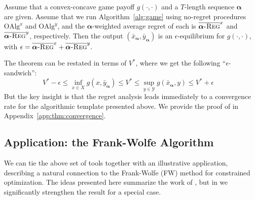 \documentclass[final,12pt]{colt2018} %
\def\balpha{\boldsymbol{\alpha}}
\def\alg{\text{OAlg}}
\newcommand{\avgregret}[1]{\overline{\balpha\textsc{-Reg}}^{#1}}
\newcommand{\YY}{\mathcal{Y}}
\newcommand{\pr}[1]{\left(#1\right)}
\begin{document}




\begin{theorem} \label{thm:convergence}
	Assume that a convex-concave game payoff $g(\cdot, \cdot)$ and a $T$-length sequence $\balpha$ are given. Assume that we run Algorithm~\ref{alg:game} using no-regret procedures $\alg^x$ and $\alg^y$, and the $\balpha$-weighted average regret of each is $\avgregret{x}$ and $\avgregret{y}$, respectively. Then the output  $(\bar{x}_{\balpha},\bar{y}_{\balpha})$ is an $\epsilon$-equilibrium for $g(\cdot, \cdot)$, with $\epsilon = \avgregret{x} + \avgregret{y}.$
\end{theorem}
The theorem can be restated in terms of $V^*$, where we get the following ``$\epsilon$-sandwich'':
\begin{equation} \label{eq:xyguarantee}
\textstyle   V^* - \epsilon
   \leq \inf_{x\in X} g \pr{x, \bar{y}_{\balpha}} 
   \leq V^* 
   \leq \sup_{y\in \YY} g\pr{ \bar{x}_{\balpha}, y}  
   \leq  V^* + \epsilon
\end{equation}
But the key insight is that the regret analysis leads immediately to a convergence rate for the algorithmic template presented above. We provide the proof of  in Appendix~\ref{app:thm:convergence}.
\subsection{Application: the Frank-Wolfe Algorithm}
We can tie the above set of tools together with an illustrative application, describing a natural connection to the Frank-Wolfe (FW) method \citep{frank1956algorithm} for constrained optimization. The ideas presented here summarize the work of \citet{AW17},  but in  we significantly strengthen the result for a special case.
\end{document}
